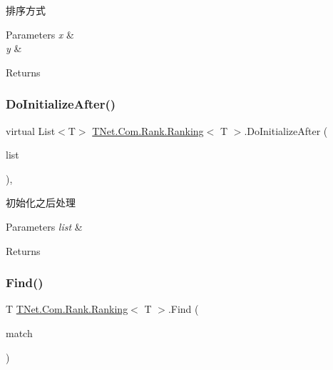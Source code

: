 排序方式 


\begin{DoxyParams}{Parameters}
{\em x} & \\
\hline
{\em y} & \\
\hline
\end{DoxyParams}
\begin{DoxyReturn}{Returns}

\end{DoxyReturn}
\mbox{\label{class_t_net_1_1_com_1_1_rank_1_1_ranking_a5ac68ac1d83bcd80291fca368d3a63f7}} 
\subsubsection{\texorpdfstring{Do\+Initialize\+After()}{DoInitializeAfter()}}
{\footnotesize\ttfamily virtual List$<$T$>$ \mbox{\hyperlink{class_t_net_1_1_com_1_1_rank_1_1_ranking}{T\+Net.\+Com.\+Rank.\+Ranking}}$<$ T $>$.Do\+Initialize\+After (\begin{DoxyParamCaption}\item[{List$<$ T $>$}]{list }\end{DoxyParamCaption})\hspace{0.3cm}{\ttfamily [protected]}, {\ttfamily [virtual]}}



初始化之后处理 


\begin{DoxyParams}{Parameters}
{\em list} & \\
\hline
\end{DoxyParams}
\begin{DoxyReturn}{Returns}

\end{DoxyReturn}
\mbox{\label{class_t_net_1_1_com_1_1_rank_1_1_ranking_a4ca04c20afe14ff6cb3b421387151234}} 
\subsubsection{\texorpdfstring{Find()}{Find()}}
{\footnotesize\ttfamily T \mbox{\hyperlink{class_t_net_1_1_com_1_1_rank_1_1_ranking}{T\+Net.\+Com.\+Rank.\+Ranking}}$<$ T $>$.Find (\begin{DoxyParamCaption}\item[{Predicate$<$ T $>$}]{match }\end{DoxyParamCaption})}



